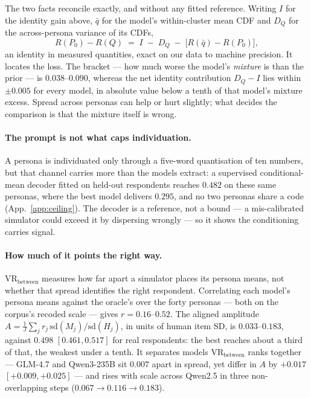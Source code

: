 \documentclass[11pt]{article}
\begin{document}
The two facts reconcile exactly, and without any fitted reference. Writing $I$
for the identity gain above, $\bar q$ for the model's within-cluster mean CDF and
$D_Q$ for the across-persona variance of its CDFs,
\begin{equation}
R(P_0)-R(Q)\;=\;I\;-\;D_Q\;-\;\big[R(\bar q)-R(P_0)\big],
\label{eq:decomp}
\end{equation}
an identity in measured quantities, exact on our data to machine precision. It
locates the loss. The bracket --- how much worse the model's \emph{mixture} is
than the prior --- is $0.038$--$0.090$, whereas the net identity contribution
$D_Q-I$ lies within $\pm0.005$ for every model, in absolute value below a tenth
of that model's mixture excess. Spread across personas can help or hurt
slightly; what decides the comparison is that the mixture itself is wrong.

\paragraph{The prompt is not what caps individuation.} A persona is individuated
only through a five-word quantisation of ten numbers, but that channel carries
more than the models extract: a supervised conditional-mean decoder fitted on
held-out respondents reaches $0.482$ on these same personas, where the best model
delivers $0.295$, and no two personas share a code (App.~\ref{app:ceiling}). The
decoder is a reference, not a bound --- a mis-calibrated simulator could exceed it
by dispersing wrongly --- so it shows the conditioning carries signal.

\paragraph{How much of it points the right way.} $\mathrm{VR}_\text{between}$
measures how far apart a simulator places its persona means, not whether that
spread identifies the right respondent. Correlating each model's persona means
against the oracle's over the forty personas --- both on the corpus's recoded
scale --- gives $r=0.16$--$0.52$. The aligned amplitude
$A=\frac{1}{J}\sum_j r_j\,\mathrm{sd}(M_j)/\mathrm{sd}(H_j)$, in units of human
item SD, is $0.033$--$0.183$, against $0.498$ $[0.461,0.517]$ for real
respondents: the best reaches about a third of that, the weakest under a tenth.
It separates models $\mathrm{VR}_\text{between}$ ranks together --- GLM-4.7 and
Qwen3-235B sit $0.007$ apart in spread, yet differ in $A$ by $+0.017$
$[+0.009,+0.025]$ --- and rises with scale across Qwen2.5 in three
non-overlapping steps ($0.067\to0.116\to0.183$).
\end{document}
